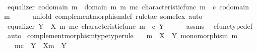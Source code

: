 \begin{isabellebody}
\ \ \isamarkupfalse%
\ \isamarkupfalse%
\ {\isachardoublequoteopen}equalizer\ {\isacharparenleft}{\kern0pt}codomain\ m\ {\isasymsetminus}\ {\isacharparenleft}{\kern0pt}domain\ m{\isacharcomma}{\kern0pt}\ m{\isacharparenright}{\kern0pt}{\isacharparenright}{\kern0pt}\ m\isactrlsup c\ {\isacharparenleft}{\kern0pt}characteristic{\isacharunderscore}{\kern0pt}func\ m{\isacharparenright}{\kern0pt}\ {\isacharparenleft}{\kern0pt}{\isasymf}\ {\isasymcirc}\isactrlsub c\ {\isasymbeta}\isactrlbsub codomain\ m\isactrlesub {\isacharparenright}{\kern0pt}{\isachardoublequoteclose}\isanewline
\ \ \ \ \isamarkupfalse%
\ {\isacharparenleft}{\kern0pt}unfold\ complement{\isacharunderscore}{\kern0pt}morphism{\isacharunderscore}{\kern0pt}def{\isacharcomma}{\kern0pt}\ rule{\isacharunderscore}{\kern0pt}tac\ someI{\isacharunderscore}{\kern0pt}ex{\isacharcomma}{\kern0pt}\ auto{\isacharparenright}{\kern0pt}\isanewline
\ \ \isamarkupfalse%
\ \isamarkupfalse%
\ {\isachardoublequoteopen}equalizer\ {\isacharparenleft}{\kern0pt}Y\ {\isasymsetminus}\ {\isacharparenleft}{\kern0pt}X{\isacharcomma}{\kern0pt}\ m{\isacharparenright}{\kern0pt}{\isacharparenright}{\kern0pt}\ m\isactrlsup c\ {\isacharparenleft}{\kern0pt}characteristic{\isacharunderscore}{\kern0pt}func\ m{\isacharparenright}{\kern0pt}\ {\isacharparenleft}{\kern0pt}{\isasymf}\ {\isasymcirc}\isactrlsub c\ {\isasymbeta}\isactrlbsub Y\isactrlesub {\isacharparenright}{\kern0pt}{\isachardoublequoteclose}\isanewline
\ \ \ \ \isamarkupfalse%
\ assms\ \isamarkupfalse%
\ cfunc{\isacharunderscore}{\kern0pt}type{\isacharunderscore}{\kern0pt}def\ \isamarkupfalse%
\ auto\isanewline
{}\isamarkupfalse%
%
\endisatagproof
{\isafoldproof}%
%
\isadelimproof
\isanewline
%
\endisadelimproof
\isanewline
{}\isamarkupfalse%
\ complement{\isacharunderscore}{\kern0pt}morphism{\isacharunderscore}{\kern0pt}type{\isacharbrackleft}{\kern0pt}type{\isacharunderscore}{\kern0pt}rule{\isacharbrackright}{\kern0pt}{\isacharcolon}{\kern0pt}\isanewline
\ \ \ {\isachardoublequoteopen}m\ {\isacharcolon}{\kern0pt}\ X\ {\isasymrightarrow}\ Y{\isachardoublequoteclose}\ {\isachardoublequoteopen}monomorphism\ m{\isachardoublequoteclose}\isanewline
\ \ \ {\isachardoublequoteopen}m\isactrlsup c\ {\isacharcolon}{\kern0pt}\ Y\ {\isasymsetminus}\ {\isacharparenleft}{\kern0pt}X{\isacharcomma}{\kern0pt}m{\isacharparenright}{\kern0pt}\ {\isasymrightarrow}\ Y{\isachardoublequoteclose}\isanewline

\end{isabellebody}
